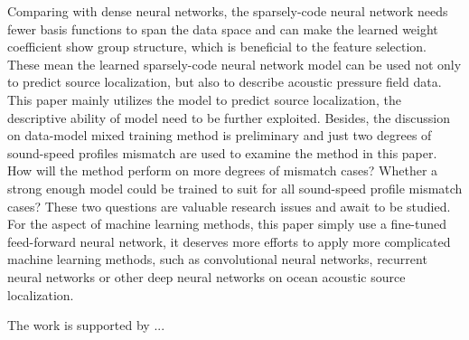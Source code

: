 Comparing with dense neural networks, the sparsely-code neural network needs fewer basis functions to span the data space and can make the learned weight coefficient show group structure, which is beneficial to the feature selection.
These mean the learned sparsely-code neural network model can be used not only to predict source localization, but also to describe acoustic pressure field data. This paper mainly utilizes the model to predict source localization, the descriptive ability of model need to be further exploited.
Besides, the discussion on data-model mixed training method is preliminary and just two degrees of sound-speed profiles mismatch are used to
examine the method in this paper. How will the method perform on more degrees of mismatch cases? Whether a strong enough model could be trained to suit for all sound-speed profile mismatch cases? These two questions are valuable research issues and await to be studied.
For the aspect of machine learning methods, this paper simply use a fine-tuned feed-forward neural network,
it deserves more efforts to apply more complicated machine learning methods, such as convolutional neural networks, recurrent neural networks or other deep neural networks on ocean acoustic source localization.

\begin{acks}
The work is supported by ...
\end{acks}
